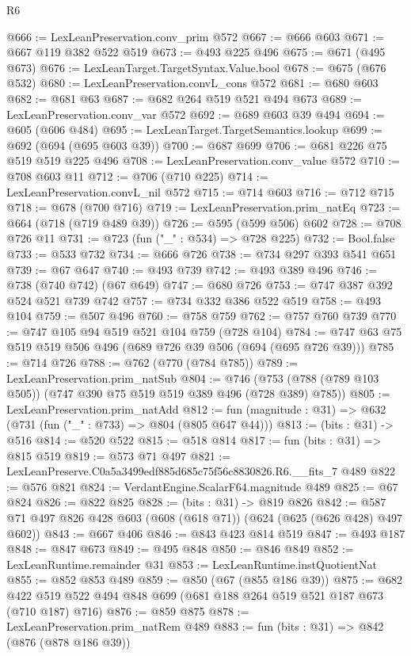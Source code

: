 \begin{lexlean}{R6}
\begin{coremodule}
@666 := LexLeanPreservation.conv_prim @572
@667 := @666 @603
@671 := @667 @119 @382 @522 @519
@673 := @493 @225 @496
@675 := @671 (@495 @673)
@676 := LexLeanTarget.TargetSyntax.Value.bool
@678 := @675 (@676 @532)
@680 := LexLeanPreservation.convL_cons @572
@681 := @680 @603
@682 := @681 @63
@687 := @682 @264 @519 @521 @494 @673
@689 := LexLeanPreservation.conv_var @572
@692 := @689 @603 @39 @494
@694 := @605 (@606 @484)
@695 := LexLeanTarget.TargetSemantics.lookup
@699 := @692 (@694 (@695 @603 @39))
@700 := @687 @699
@706 := @681 @226 @75 @519 @519 @225 @496
@708 := LexLeanPreservation.conv_value @572
@710 := @708 @603 @11
@712 := @706 (@710 @225)
@714 := LexLeanPreservation.convL_nil @572
@715 := @714 @603
@716 := @712 @715
@718 := @678 (@700 @716)
@719 := LexLeanPreservation.prim_natEq
@723 := @664 (@718 (@719 @489 @39))
@726 := @595 (@599 @506) @602
@728 := @708 @726 @11
@731 := @723 (fun ("_" : @534) => @728 @225)
@732 := Bool.false
@733 := @533 @732
@734 := @666 @726
@738 := @734 @297 @393 @541 @651
@739 := @67 @647
@740 := @493 @739
@742 := @493 @389 @496
@746 := @738 (@740 @742) (@67 @649)
@747 := @680 @726
@753 := @747 @387 @392 @524 @521 @739 @742
@757 := @734 @332 @386 @522 @519
@758 := @493 @104
@759 := @507 @496
@760 := @758 @759
@762 := @757 @760 @739
@770 := @747 @105 @94 @519 @521 @104 @759 (@728 @104)
@784 := @747 @63 @75 @519 @519 @506 @496 (@689 @726 @39 @506 (@694 (@695 @726 @39)))
@785 := @714 @726
@788 := @762 (@770 (@784 @785))
@789 := LexLeanPreservation.prim_natSub
@804 := @746 (@753 (@788 (@789 @103 @505)) (@747 @390 @75 @519 @519 @389 @496 (@728 @389) @785))
@805 := LexLeanPreservation.prim_natAdd
@812 := fun (magnitude : @31) => @632 (@731 (fun ("_" : @733) => @804 (@805 @647 @44)))
@813 := (bits : @31) -> @516
@814 := @520 @522
@815 := @518 @814
@817 := fun (bits : @31) => @815 @519
@819 := @573 @71 @497
@821 := LexLeanPreserve.C0a5a3499edf885d685c75f56c8830826.R6.__fits_7 @489
@822 := @576 @821
@824 := VerdantEngine.ScalarF64.magnitude @489
@825 := @67 @824
@826 := @822 @825
@828 := (bits : @31) -> @819 @826
@842 := @587 @71 @497 @826 @428 @603 (@608 (@618 @71)) (@624 (@625 (@626 @428) @497 @602))
@843 := @667 @406
@846 := @843 @423 @814 @519
@847 := @493 @187
@848 := @847 @673
@849 := @495 @848
@850 := @846 @849
@852 := LexLeanRuntime.remainder @31
@853 := LexLeanRuntime.instQuotientNat
@855 := @852 @853 @489
@859 := @850 (@67 (@855 @186 @39))
@875 := @682 @422 @519 @522 @494 @848 @699 (@681 @188 @264 @519 @521 @187 @673 (@710 @187) @716)
@876 := @859 @875
@878 := LexLeanPreservation.prim_natRem @489
@883 := fun (bits : @31) => @842 (@876 (@878 @186 @39))

\end{coremodule}
\end{lexlean}
